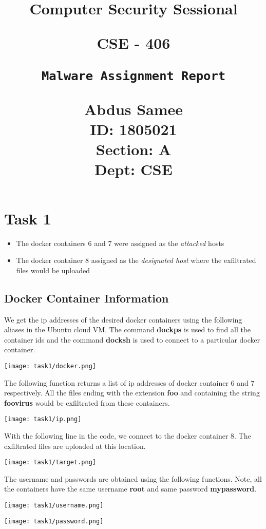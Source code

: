 \documentclass{article}
\title{%
  \begin{center}
        \vspace*{1cm}
            
        \Huge
        \textbf{Computer Security Sessional}
            
        \vspace{0.5cm}
        \LARGE
        CSE - 406
            
        \vspace{2cm}
            
        \Huge
        \texttt{Malware Assignment Report}
                        
        \vspace{0.8cm}
                        
        \Large
        Abdus Samee\\
        ID: 1805021\\
        Section: A\\
        Dept: CSE\\
    \end{center}
  }
\date{}
\begin{document}
\maketitle
\newpage

\section{Task 1}
\begin{itemize}
    \item The docker containers $6$ and $7$ were assigned as the \textit{attacked} hosts
    \item The docker container $8$ assigned as the \textit{designated host} where the exfiltrated files would be uploaded
\end{itemize}

\subsection{Docker Container Information}
We get the ip addresses of the desired docker containers using the following aliases in the Ubuntu cloud VM. The command \textbf{dockps} is used to find all the container ids and the command \textbf{docksh} is used to connect to a particular docker container.
\begin{center}
    \texttt{[image: task1/docker.png]}
\end{center}

The following function returns a list of ip addresses of docker container $6$ and $7$ respectively. All the files ending with the extension \textbf{foo} and containing the string \textbf{foovirus} would be exfiltrated from these containers.
\begin{center}
    \texttt{[image: task1/ip.png]}
\end{center}

With the following line in the code, we connect to the docker container $8$. The exfiltrated files are uploaded at this location.
\begin{center}
    \texttt{[image: task1/target.png]}
\end{center}

The username and passwords are obtained using the following functions. Note, all the containers have the same username \textbf{root} and same password \textbf{mypassword}.
\begin{center}
    \texttt{[image: task1/username.png]}
\end{center}
\begin{center}
    \texttt{[image: task1/password.png]}
\end{center}
\end{document}
